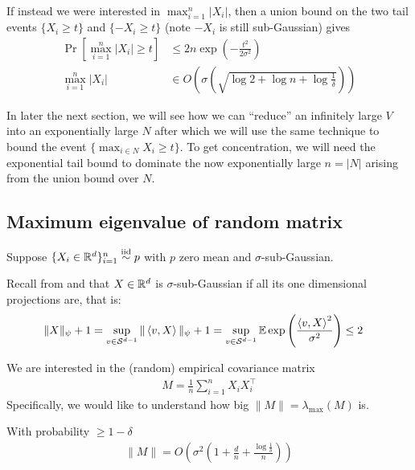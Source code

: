 If instead we were interested in $\max_{i=1}^n \lvert X_i \rvert$, then a union bound on the two
tail events $\{X_i \geq t\}$ and $\{-X_i \geq t\}$ (note $-X_i$ is still sub-Gaussian) gives
\begin{align}
    \Pr\left[\max_{i=1}^n \lvert X_i \rvert \geq t\right] &\leq 2 n \exp\left( -\frac{t^2}{2 \sigma^2} \right) 
    \label{eq:tail-bound-abs-value-two-factor}\\
    \max_{i=1}^n \lvert X_i \rvert &\in O\left( \sigma \left(\sqrt{\log 2 + \log n + \log \frac{1}{\delta}}\right) \right)
\end{align}

In later the next section, we will see how we can ``reduce'' an infinitely large $V$
into an exponentially large $N$ after which
we will use the same technique to bound the event $\{ \max_{i \in N} X_i \geq t \}$.
To get concentration, we will need the exponential tail bound to dominate the now exponentially large $n = \lvert N \rvert$
arising from the union bound over $N$.

\subsection{Maximum eigenvalue of random matrix}

Suppose $\{X_i \in \mathbb{R}^d \}_{i=1}^n \overset{\text{iid}}{\sim} p$ with $p$ zero mean and $\sigma$-sub-Gaussian.

Recall from  and 
that $X \in \mathbb{R}^d$ is $\sigma$-sub-Gaussian if all its one dimensional projections are, that is:
\begin{align}
    \|X\|_\psi + 1
    &= \sup_{v \in \mathcal{S}^{d-1}} \|\braket{v,X}\|_\psi + 1
    = \sup_{v \in \mathcal{S}^{d-1}} \mathbb{E} \exp\left(\frac{\braket{v, X}^2}{\sigma^2} \right)
    \leq 2\label{eq:9-10-recap-multivar-sub-gaussian}
\end{align}

We are interested in the (random) empirical covariance matrix
\begin{align}
    M = \frac{1}{n} \sum_{i=1}^n X_i X_i^\top
\end{align}
Specifically, we would like to understand how big $\|M\| = \lambda_{\max}(M)$ is.

\begin{proposition}\label{prop:9-10-cov-operator-norm}
    With probability $\geq 1 - \delta$
    \begin{align}
        \|M\| = O\left(\sigma^2 \left( 1 + \frac{d}{n} + \frac{\log \frac{1}{\delta}}{n} \right) \right)
    \end{align}
\end{proposition}

